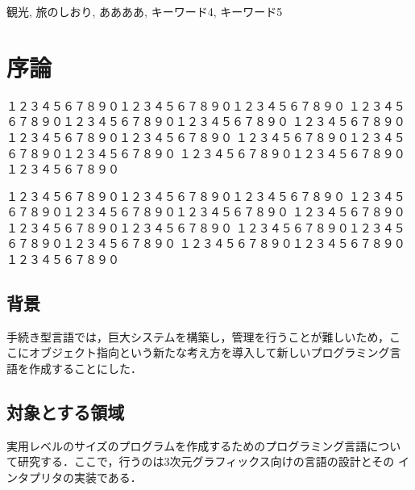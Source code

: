 \documentclass{funthesis}
\begin{document}
\begin{jkeyword}
観光, 旅のしおり, ああああ, キーワード4, キーワード5
\end{jkeyword}

\tableofcontents %


\chapter{序論} %

１２３４５６７８９０１２３４５６７８９０１２３４５６７８９０
１２３４５６７８９０１２３４５６７８９０１２３４５６７８９０
１２３４５６７８９０１２３４５６７８９０１２３４５６７８９０
１２３４５６７８９０１２３４５６７８９０１２３４５６７８９０
１２３４５６７８９０１２３４５６７８９０１２３４５６７８９０

１２３４５６７８９０１２３４５６７８９０１２３４５６７８９０
１２３４５６７８９０１２３４５６７８９０１２３４５６７８９０
１２３４５６７８９０１２３４５６７８９０１２３４５６７８９０
１２３４５６７８９０１２３４５６７８９０１２３４５６７８９０
１２３４５６７８９０１２３４５６７８９０１２３４５６７８９０


\section{背景} %


手続き型言語では，巨大システムを構築し，管理を行うことが難しいため，こ
こにオブジェクト指向という新たな考え方を導入して新しいプログラミング言
語を作成することにした．

\section{対象とする領域}

実用レベルのサイズのプログラムを作成するためのプログラミング言語につい
て研究する．ここで，行うのは3次元グラフィックス向けの言語の設計とその
インタプリタの実装である．
\end{document}

